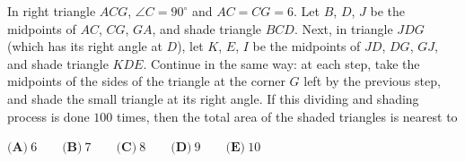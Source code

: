 In right triangle $ACG$, $\angle C=90^\circ$ and $AC=CG=6$. Let $B$, $D$, $J$ be the midpoints of $AC$, $CG$, $GA$, and shade triangle $BCD$. Next, in triangle $JDG$ (which has its right angle at $D$), let $K$, $E$, $I$ be the midpoints of $JD$, $DG$, $GJ$, and shade triangle $KDE$. Continue in the same way: at each step, take the midpoints of the sides of the triangle at the corner $G$ left by the previous step, and shade the small triangle at its right angle. If this dividing and shading process is done $100$ times, then the total area of the shaded triangles is nearest to

$\textbf{(A)}\ 6\qquad\textbf{(B)}\ 7\qquad\textbf{(C)}\ 8\qquad\textbf{(D)}\ 9\qquad\textbf{(E)}\ 10$
